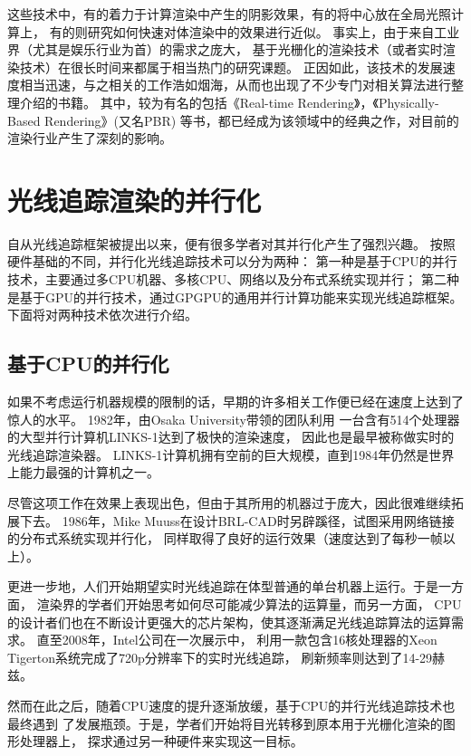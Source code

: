 这些技术中，有的着力于计算渲染中产生的阴影效果\cite{AO}，有的将中心放在全局光照计算上\cite{GI}，
有的则研究如何快速对体渲染中的效果进行近似\cite{Volume}。
事实上，由于来自工业界（尤其是娱乐行业为首）的需求之庞大，
基于光栅化的渲染技术（或者实时渲染技术）在很长时间来都属于相当热门的研究课题。
正因如此，该技术的发展速度相当迅速，与之相关的工作浩如烟海，从而也出现了不少专门对相关算法进行整理介绍的书籍。
其中，较为有名的包括《Real-time Rendering》\cite{RealTimeRendering}，《Physically-Based Rendering》\cite{PhysicallyBasedRendering}(又名PBR)
等书，都已经成为该领域中的经典之作，对目前的渲染行业产生了深刻的影响。


\section{光线追踪渲染的并行化}

自从光线追踪框架被提出以来，便有很多学者对其并行化产生了强烈兴趣。
按照硬件基础的不同，并行化光线追踪技术可以分为两种：
第一种是基于CPU的并行技术，主要通过多CPU机器、多核CPU、网络以及分布式系统实现并行；
第二种是基于GPU的并行技术，通过GPGPU的通用并行计算功能来实现光线追踪框架。
下面将对两种技术依次进行介绍。

\subsection{基于CPU的并行化}

如果不考虑运行机器规模的限制的话，早期的许多相关工作便已经在速度上达到了惊人的水平。
1982年，由Osaka University带领的团队利用
一台含有514个处理器的大型并行计算机LINKS-1达到了极快的渲染速度\cite{LINKS1}，
因此也是最早被称做实时的光线追踪渲染器。
LINKS-1计算机拥有空前的巨大规模，直到1984年仍然是世界上能力最强的计算机之一。

尽管这项工作在效果上表现出色，但由于其所用的机器过于庞大，因此很难继续拓展下去。
1986年，Mike Muuss在设计BRL-CAD时另辟蹊径，试图采用网络链接的分布式系统实现并行化，
同样取得了良好的运行效果（速度达到了每秒一帧以上）\cite{BRLCAD}。

更进一步地，人们开始期望实时光线追踪在体型普通的单台机器上运行。于是一方面，
渲染界的学者们开始思考如何尽可能减少算法的运算量，而另一方面，
CPU的设计者们也在不断设计更强大的芯片架构，使其逐渐满足光线追踪算法的运算需求。
直至2008年，Intel公司在一次展示中，
利用一款包含16核处理器的Xeon Tigerton系统完成了720p分辨率下的实时光线追踪，
刷新频率则达到了14-29赫兹\cite{QuakeWars}。

然而在此之后，随着CPU速度的提升逐渐放缓，基于CPU的并行光线追踪技术也最终遇到
了发展瓶颈。于是，学者们开始将目光转移到原本用于光栅化渲染的图形处理器上，
探求通过另一种硬件来实现这一目标。

